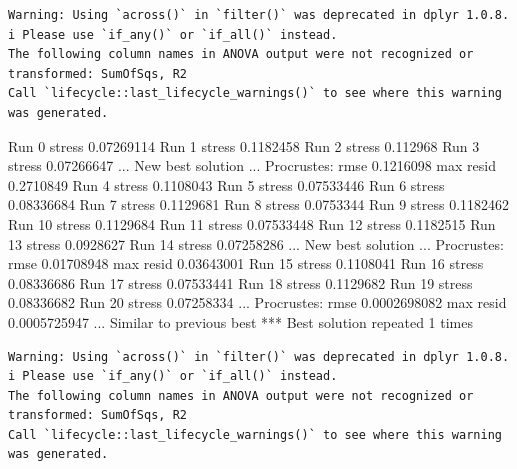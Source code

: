 \documentclass[
]{book}
\newenvironment{Shaded}{\begin{snugshade}}{\end{snugshade}}
\newcommand{\NormalTok}[1]{#1}
\begin{document}
\begin{verbatim}
Warning: Using `across()` in `filter()` was deprecated in dplyr 1.0.8.
i Please use `if_any()` or `if_all()` instead.
The following column names in ANOVA output were not recognized or transformed: SumOfSqs, R2
Call `lifecycle::last_lifecycle_warnings()` to see where this warning was generated.
\end{verbatim}

\begin{Shaded}
\begin{Highlighting}[]
\NormalTok{Run 0 stress 0.07269114 }
\NormalTok{Run 1 stress 0.1182458 }
\NormalTok{Run 2 stress 0.112968 }
\NormalTok{Run 3 stress 0.07266647 }
\NormalTok{... New best solution}
\NormalTok{... Procrustes: rmse 0.1216098  max resid 0.2710849 }
\NormalTok{Run 4 stress 0.1108043 }
\NormalTok{Run 5 stress 0.07533446 }
\NormalTok{Run 6 stress 0.08336684 }
\NormalTok{Run 7 stress 0.1129681 }
\NormalTok{Run 8 stress 0.0753344 }
\NormalTok{Run 9 stress 0.1182462 }
\NormalTok{Run 10 stress 0.1129684 }
\NormalTok{Run 11 stress 0.07533448 }
\NormalTok{Run 12 stress 0.1182515 }
\NormalTok{Run 13 stress 0.0928627 }
\NormalTok{Run 14 stress 0.07258286 }
\NormalTok{... New best solution}
\NormalTok{... Procrustes: rmse 0.01708948  max resid 0.03643001 }
\NormalTok{Run 15 stress 0.1108041 }
\NormalTok{Run 16 stress 0.08336686 }
\NormalTok{Run 17 stress 0.07533441 }
\NormalTok{Run 18 stress 0.1129682 }
\NormalTok{Run 19 stress 0.08336682 }
\NormalTok{Run 20 stress 0.07258334 }
\NormalTok{... Procrustes: rmse 0.0002698082  max resid 0.0005725947 }
\NormalTok{... Similar to previous best}
\NormalTok{*** Best solution repeated 1 times}
\end{Highlighting}
\end{Shaded}

\begin{verbatim}
Warning: Using `across()` in `filter()` was deprecated in dplyr 1.0.8.
i Please use `if_any()` or `if_all()` instead.
The following column names in ANOVA output were not recognized or transformed: SumOfSqs, R2
Call `lifecycle::last_lifecycle_warnings()` to see where this warning was generated.
\end{verbatim}
\end{document}
